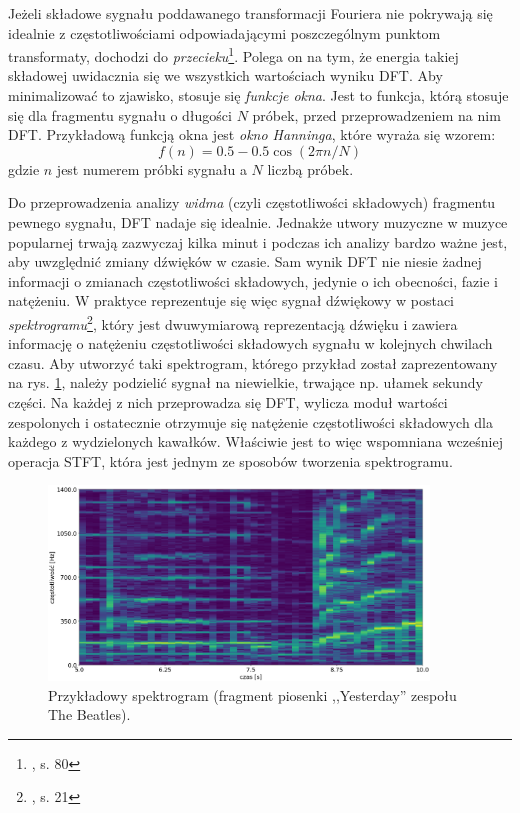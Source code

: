 Jeżeli składowe sygnału poddawanego transformacji Fouriera nie pokrywają się idealnie z częstotliwościami odpowiadającymi poszczególnym punktom transformaty, dochodzi do \emph{przecieku}\footnote{\cite{lyons_wprowadzenie_2000}, s. 80}. Polega on na tym, że energia takiej składowej uwidacznia się we wszystkich wartościach wyniku DFT. Aby minimalizować to zjawisko, stosuje się \emph{funkcje okna}. Jest to funkcja, którą stosuje się dla fragmentu sygnału o długości $N$ próbek, przed przeprowadzeniem na nim DFT. Przykładową funkcją okna jest \emph{okno Hanninga}, które wyraża się wzorem:
\begin{equation}
    f(n) = 0.5 - 0.5 \cos (2 \pi n / N)
\end{equation}
gdzie $n$ jest numerem próbki sygnału a $N$ liczbą próbek.

Do przeprowadzenia analizy \emph{widma} (czyli częstotliwości składowych) fragmentu pewnego sygnału, DFT nadaje się idealnie. Jednakże utwory muzyczne w muzyce popularnej trwają zazwyczaj kilka minut i podczas ich analizy bardzo ważne jest, aby uwzględnić zmiany dźwięków w czasie. Sam wynik DFT nie niesie żadnej informacji o zmianach częstotliwości składowych, jedynie o ich obecności, fazie i natężeniu.  W praktyce reprezentuje się więc sygnał dźwiękowy w postaci \emph{spektrogramu}\footnote{\cite{lerch_introduction_2012}, s. 21}, który jest dwuwymiarową reprezentacją dźwięku i zawiera informację o natężeniu częstotliwości składowych sygnału w kolejnych chwilach czasu. Aby utworzyć taki spektrogram, którego przykład został zaprezentowany na rys.  \ref{fig:spektrogram}, należy podzielić sygnał na niewielkie, trwające np. ułamek sekundy części. Na każdej z nich przeprowadza się DFT, wylicza moduł wartości zespolonych i ostatecznie otrzymuje się natężenie częstotliwości składowych dla każdego z wydzielonych kawałków. Właściwie jest to więc wspomniana wcześniej operacja STFT, która jest jednym ze sposobów tworzenia spektrogramu.

\begin{figure}[htb]
    \centering
    \includegraphics[width=0.9\textwidth]{images/spektrogram}
    \caption{Przykładowy spektrogram (fragment piosenki ,,Yesterday'' zespołu The Beatles).}
    \label{fig:spektrogram}
\end{figure}



